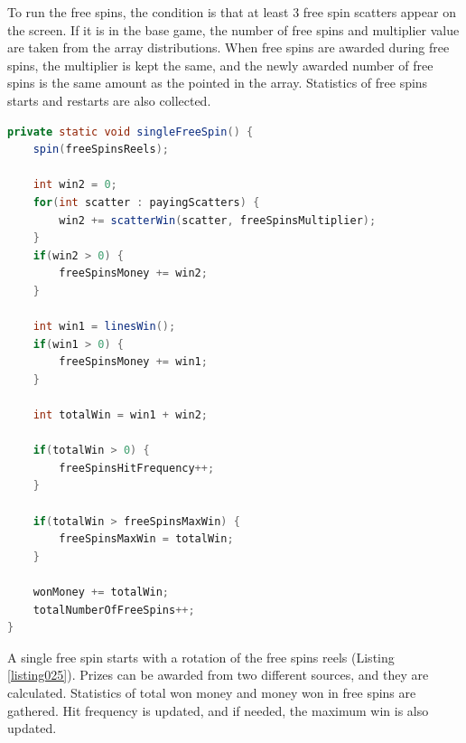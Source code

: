 \documentclass[12pt,twoside,openany]{book}
\begin{document}
To run the free spins, the condition is that at least 3 free spin scatters appear on the screen. If it is in the base game, the number of free spins and multiplier value are taken from the array distributions. When free spins are awarded during free spins, the multiplier is kept the same, and the newly awarded number of free spins is the same amount as the pointed in the array. Statistics of free spins starts and restarts are also collected.

\begin{lstlisting}[language=Java, caption={Single free spin}, label=listing025]
private static void singleFreeSpin() {
	spin(freeSpinsReels);

	int win2 = 0;
	for(int scatter : payingScatters) {
		win2 += scatterWin(scatter, freeSpinsMultiplier);
	}
	if(win2 > 0) {
		freeSpinsMoney += win2;
	}

	int win1 = linesWin();
	if(win1 > 0) {
		freeSpinsMoney += win1;
	}

	int totalWin = win1 + win2;

	if(totalWin > 0) {
		freeSpinsHitFrequency++;
	}

	if(totalWin > freeSpinsMaxWin) {
		freeSpinsMaxWin = totalWin;
	}

	wonMoney += totalWin;
	totalNumberOfFreeSpins++;
}
\end{lstlisting}

A single free spin starts with a rotation of the free spins reels (Listing \ref{listing025}). Prizes can be awarded from two different sources, and they are calculated. Statistics of total won money and money won in free spins are gathered. Hit frequency is updated, and if needed, the maximum win is also updated.
\end{document}

